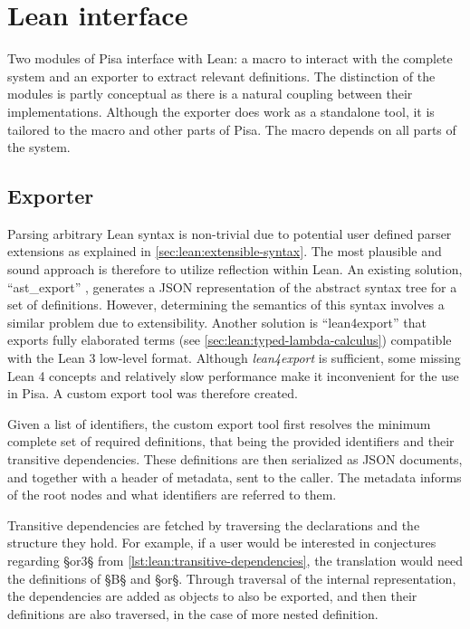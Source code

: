 \section{Lean interface}\label{sec:lean-interface}
Two modules of Pisa interface with Lean: a macro to interact with the complete system and an exporter to extract relevant definitions.
The distinction of the modules is partly conceptual as there is a natural coupling between their implementations.
Although the exporter does work as a standalone tool, it is tailored to the macro and other parts of Pisa.
The macro depends on all parts of the system.

\subsection{Exporter}\label{sec:lean-interface:exporter}
Parsing arbitrary Lean syntax is non-trivial due to potential user defined parser extensions as explained in \cref{sec:lean:extensible-syntax}.
The most plausible and sound approach is therefore to utilize reflection within Lean.
An existing solution, ``ast\_export'' \autocite{ast-export}, generates a JSON representation of the abstract syntax tree for a set of definitions.
However, determining the semantics of this syntax involves a similar problem due to extensibility.
Another solution is ``lean4export'' \autocite{Lean4Export} that exports fully elaborated terms (see \cref{sec:lean:typed-lambda-calculus}) compatible with the Lean 3 low-level format.
Although \textit{lean4export} is sufficient, some missing Lean 4 concepts and relatively slow performance make it inconvenient for the use in Pisa.
A custom export tool was therefore created.

Given a list of identifiers, the custom export tool first resolves the minimum complete set of required definitions, that being the provided identifiers and their transitive dependencies.
These definitions are then serialized as JSON documents, and together with a header of metadata, sent to the caller.
The metadata informs of the root nodes and what identifiers are referred to them.

Transitive dependencies are fetched by traversing the declarations and the structure they hold.
For example, if a user would be interested in conjectures regarding §or3§ from \cref{lst:lean:transitive-dependencies}, the translation would need the definitions of §B§ and §or§.
Through traversal of the internal representation, the dependencies are added as objects to also be exported, and then their definitions are also traversed, in the case of more nested definition.

